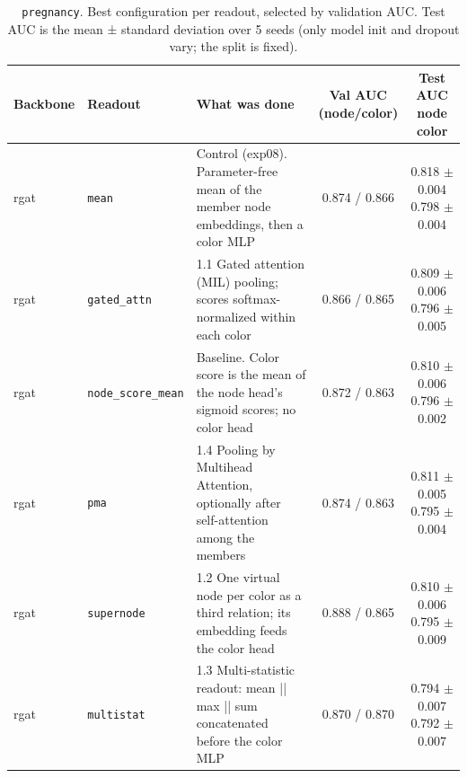 \begin{table}[t]
\centering
\small
\begin{tabularx}{\textwidth}{llXcc}
\toprule
Backbone & Readout & What was done & \makecell{Val AUC\\(node/color)} & \makecell{Test AUC\\node\\color} \\
\midrule
rgat & \texttt{mean} & Control (exp08). Parameter-free mean of the member node embeddings, then a color MLP & 0.874 / 0.866 & \makecell{0.818 $\pm$ 0.004\\0.798 $\pm$ 0.004} \\
rgat & \texttt{gated\_attn} & 1.1 Gated attention (MIL) pooling; scores softmax-normalized within each color & 0.866 / 0.865 & \makecell{0.809 $\pm$ 0.006\\0.796 $\pm$ 0.005} \\
rgat & \texttt{node\_score\_mean} & Baseline. Color score is the mean of the node head's sigmoid scores; no color head & 0.872 / 0.863 & \makecell{0.810 $\pm$ 0.006\\0.796 $\pm$ 0.002} \\
rgat & \texttt{pma} & 1.4 Pooling by Multihead Attention, optionally after self-attention among the members & 0.874 / 0.863 & \makecell{0.811 $\pm$ 0.005\\0.795 $\pm$ 0.004} \\
rgat & \texttt{supernode} & 1.2 One virtual node per color as a third relation; its embedding feeds the color head & 0.888 / 0.865 & \makecell{0.810 $\pm$ 0.006\\0.795 $\pm$ 0.009} \\
rgat & \texttt{multistat} & 1.3 Multi-statistic readout: mean || max || sum concatenated before the color MLP & 0.870 / 0.870 & \makecell{0.794 $\pm$ 0.007\\0.792 $\pm$ 0.007} \\
\bottomrule
\end{tabularx}
\caption{\texttt{pregnancy}. Best configuration per readout, selected by validation AUC. Test AUC is the mean ± standard deviation over 5 seeds (only model init and dropout vary; the split is fixed).}
\label{tab:exp09-pooling}
\end{table}
